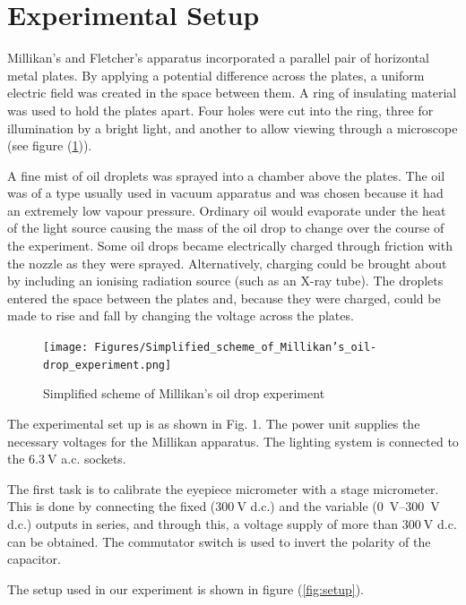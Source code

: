 \documentclass[%
 reprint,
 amsmath,amssymb,
 aps,
]{revtex4-2}
\begin{document}
\section{Experimental Setup}
    Millikan's and Fletcher's apparatus incorporated a parallel pair of horizontal metal plates. By applying a potential difference across the plates, a uniform electric field was created in the space between them. A ring of insulating material was used to hold the plates apart. Four holes were cut into the ring, three for illumination by a bright light, and another to allow viewing through a microscope (see figure (\ref{fig:schematic})).
    \par
    A fine mist of oil droplets was sprayed into a chamber above the plates. The oil was of a type usually used in vacuum apparatus and was chosen because it had an extremely low vapour pressure. Ordinary oil would evaporate under the heat of the light source causing the mass of the oil drop to change over the course of the experiment. Some oil drops became electrically charged through friction with the nozzle as they were sprayed. Alternatively, charging could be brought about by including an ionising radiation source (such as an X-ray tube). The droplets entered the space between the plates and, because they were charged, could be made to rise and fall by changing the voltage across the plates.
    \begin{figure}
        \centering
        \texttt{[image: Figures/Simplified\_scheme\_of\_Millikan’s\_oil-drop\_experiment.png]}
        \caption{Simplified scheme of Millikan's oil drop experiment}
        \label{fig:schematic}
    \end{figure}
    \par
    The experimental set up is as shown in Fig. 1. The power unit supplies the necessary voltages for the Millikan apparatus. The lighting system is connected to the $\SI{6.3}{\volt}$ a.c. sockets.
    \par
    The first task is to calibrate the eyepiece micrometer with a stage micrometer. This is done by connecting the fixed ($\SI{300}{\volt}$ d.c.) and the variable (\SIrange{0}{300}{\volt} d.c.) outputs in series, and through this, a voltage supply of more than $\SI{300}{\volt}$ d.c. can be obtained. The commutator switch is used to invert the polarity of the capacitor.
    \par
    The setup used in our experiment is shown in figure (\ref{fig:setup}).
\end{document}
